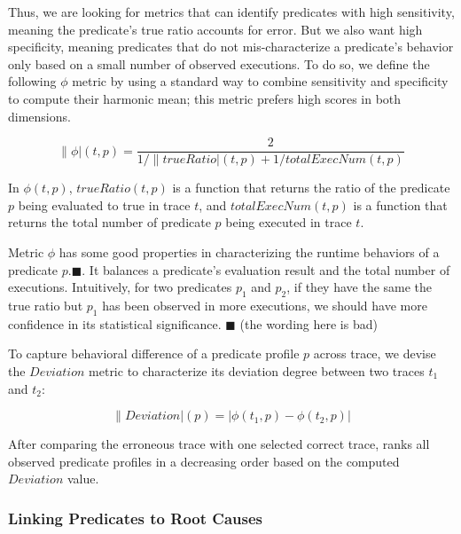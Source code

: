 Thus, we are looking for metrics that can identify
predicates with high sensitivity, meaning the predicate's true
ratio accounts for error. But we also want
high specificity, meaning predicates that do not mis-characterize
a predicate's behavior only based on a small number of
observed executions. To do so, we define the following
$\phi$ metric by using a standard way to
combine sensitivity and specificity to compute their
harmonic mean; this metric prefers high scores in both dimensions. 

\vspace{-3mm}

\[
\|\phi|(t, p) = \frac{2}{{1}/{\|trueRatio|(t, p)} + {1}/{totalExecNum(t, p)}}
\]

In $\phi(t, p)$, $trueRatio(t, p)$ is a function that returns the ratio of the predicate $p$ being
evaluated to true in trace $t$, and $totalExecNum(t, p)$ is a function
that returns the total number of predicate $p$ being executed in trace $t$.

Metric $\phi$ has some good properties in characterizing the
runtime behaviors of a predicate $p$.$\blacksquare$.
It balances a predicate's evaluation result and the total number of executions.
Intuitively, for two predicates $p_1$ and $p_2$, if they have the same
the true ratio but $p_1$ has been observed in more executions, we
should have more confidence in its statistical significance. $\blacksquare$
(the wording here is bad)

To capture behavioral difference of a predicate profile $p$
across trace, we devise the  $Deviation$ metric
to characterize its deviation degree between two traces $t_1$ and $t_2$:

\vspace{-3mm}

\[
\|Deviation|(p) = |\phi(t_1, p) - \phi(t_2, p)|
\]



After comparing the erroneous trace with one selected correct trace,
\ourtool ranks all observed predicate profiles in
a decreasing order based on the computed $Deviation$ value.






\subsubsection{Linking Predicates to Root Causes}
\label{sec:linking}


